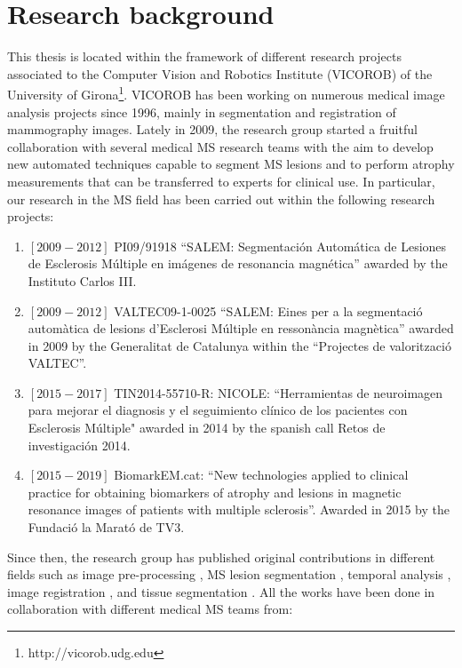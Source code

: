 \section{Research background}
\label{sec:research_background}

This thesis is located within the framework of different research projects associated to the Computer Vision and Robotics Institute (VICOROB) of the University of Girona\footnote{http://vicorob.udg.edu}. VICOROB has been working on numerous medical image analysis projects since 1996, mainly in segmentation and registration of mammography images. Lately in 2009, the research group started a fruitful collaboration with several medical MS research teams with the aim to develop new automated techniques capable to segment MS lesions and to perform atrophy measurements that can be transferred to experts for clinical use. In particular, our research in the MS field has been carried out within the following research projects:

\begin{enumerate}

\item $[2009-2012]$ PI09/91918 ``SALEM: Segmentaci\'{o}n Autom\'{a}tica de Lesiones de Esclerosis M\'{u}ltiple en im\'{a}genes de resonancia magn\'{e}tica'' awarded by the Instituto Carlos III. 

\item $[2009-2012]$ VALTEC09-1-0025 ``SALEM: Eines per a la segmentaci\'{o} autom\`{a}tica de lesions d'Esclerosi M\'{u}ltiple en resson\`{a}ncia magn\`{e}tica'' awarded in 2009 by the Generalitat de Catalunya within the ``Projectes de valoritzaci\'{o} VALTEC''.

\item $[2015-2017]$ TIN2014-55710-R: NICOLE: ``Herramientas de neuroimagen para mejorar el diagnosis y el seguimiento cl\'{i}nico de los pacientes con Esclerosis M\'{u}ltiple" awarded in 2014 by the spanish call Retos de investigaci\'{o}n 2014.

\item $[2015-2019]$ BiomarkEM.cat: ``New technologies applied to clinical practice for obtaining biomarkers of  atrophy and lesions in magnetic resonance images of patients with multiple sclerosis''. Awarded in 2015 by the Fundaci\'{o} la Marat\'{o} de TV3.

\end{enumerate}

Since then, the research group has published original contributions in different fields such as image pre-processing \cite{Roura2014}, MS lesion segmentation \cite{Cabezas2014, Cabezas2014b, Llado2012, Roura2015}, temporal analysis \cite{Ganiler2014,Llado2012b}, image registration \cite{Diez2014, Roura2015b}, and tissue segmentation \cite{Cabezas2011}. All the works have been done in collaboration with different medical MS teams from:

